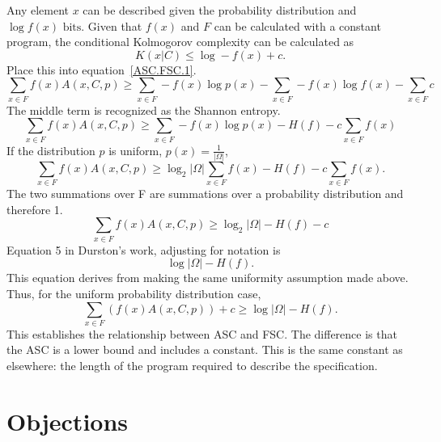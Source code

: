 Any element $x$ can be described given the probability distribution and $\log f(x) \mbox{ bits}$.
Given that $f(x)$ and $F$ can be calculated with a constant program, the conditional Kolmogorov complexity can be calculated as
\begin{equation}
    K(x|C) \leq \log -f(x) + c  \mbox{.}
\end{equation}
Place this into equation~\ref{ASC.FSC.1}.
\begin{equation}
    \sum_{x \in F} f(x) A(x,C,p) 
    \geq \sum_{x \in F} -f(x)\log p(x) - \sum_{x \in F} - f(x) \log f(x) - \sum_{x \in F} c
\end{equation}
The middle term is recognized as the Shannon entropy.
\begin{equation}
    \sum_{x \in F} f(x) A(x,C,p) 
    \geq \sum_{x \in F} -f(x) \log p(x) - H(f) - c \sum_{x \in F} f(x)
\end{equation}
If the distribution $p$ is uniform, $p(x) = \frac{1}{|\Omega|}$,
\begin{equation}
    \sum_{x \in F} f(x) A(x,C,p) 
    \geq \log_2 |\Omega| \sum_{x \in F} f(x) - H(f) - c \sum_{x \in F} f(x)  \mbox{.}
\end{equation}
The two summations over F are summations over a probability distribution and therefore 1.
\begin{equation}
    \sum_{x \in F} f(x) A(x,C,p) 
    \geq \log_2 |\Omega| - H(f) - c 
\end{equation}
Equation 5 in Durston's work, adjusting for notation is
\begin{equation}
    \log |\Omega| - H(f)  \mbox{.}
\end{equation}
This equation derives from making the same uniformity assumption made above.
Thus, for the uniform probability distribution case,
\begin{equation}
    \sum_{x \in F} (f(x) A(x,C,p) ) + c
    \geq \log |\Omega| - H(f)  \mbox{.}
\end{equation}
This establishes the relationship between ASC and FSC.
The difference is that the ASC is a lower bound and includes a constant.
This is the same constant as elsewhere: the length of the program required to describe the specification.

\section{Objections}

